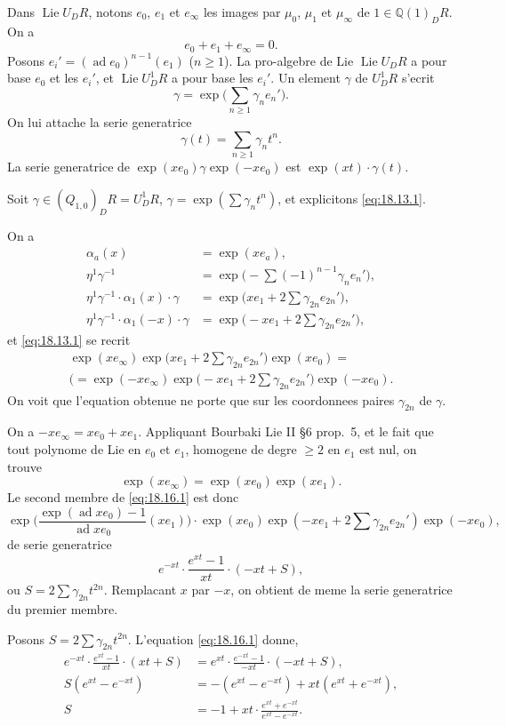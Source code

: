\documentclass[12pt,a4paper]{article}
\theoremstyle{plain}
\theoremstyle{definition}
\theoremstyle{remark}
\DeclareMathOperator{\Lie}{Lie}
\DeclareMathOperator{\ad}{ad}
\newcommand{\dR}{DR}
\newcommand{\QQ}{\mathbb{Q}}
\begin{document}
Dans $\Lie U_\dR$, notons $e_0$, $e_1$ et $e_\infty$ les images par
$\mu_0$, $\mu_1$ et $\mu_\infty$ de $1 \in \QQ(1)_\dR$. On a
\[
e_0 + e_1 + e_\infty = 0.
\]
Posons $e_i' = (\ad e_0)^{n-1}(e_1)$ ($n \geq 1$). La pro-algebre de
Lie $\Lie U_\dR$ a pour base $e_0$ et les $e_i'$, et
$\Lie U^1_\dR$ a pour base les $e_i'$. Un element $\gamma$ de
$U^1_\dR$ s'ecrit
\[
\gamma = \exp\bigl(\sum_{n \geq 1} \gamma_n e_n'\bigr).
\]
On lui attache la serie generatrice
\[
\gamma(t) = \sum_{n \geq 1} \gamma_n t^n.
\]
La serie generatrice de $\exp(xe_0) \gamma \exp(-xe_0)$ est
$\exp(xt) \cdot \gamma(t)$.

Soit $\gamma \in (Q_{1,0})_\dR = U^1_\dR$,
$\gamma = \exp(\sum \gamma_n t^n)$, et explicitons
\eqref{eq:18.13.1}.

On a
\begin{align*}
\alpha_a(x) &= \exp(xe_a), \\
\eta^1 \gamma^{-1} &= \exp\bigl(-\sum (-1)^{n-1} \gamma_n
e_n'\bigr), \\
\eta^1 \gamma^{-1} \cdot \alpha_1(x) \cdot \gamma &=
\exp\bigl(xe_1 + 2\sum \gamma_{2n} e_{2n}'\bigr), \\
\eta^1 \gamma^{-1} \cdot \alpha_1(-x) \cdot \gamma &=
\exp\bigl(-xe_1 + 2\sum \gamma_{2n} e_{2n}'\bigr),
\end{align*}
et \eqref{eq:18.13.1} se recrit
\begin{multline}\label{eq:18.16.1}
\exp(xe_\infty) \exp\bigl(xe_1 + 2\sum \gamma_{2n}
e_{2n}'\bigr) \exp(xe_0) = \\(= 
\exp(-xe_\infty) \exp\bigl(-xe_1 + 2\sum \gamma_{2n}
e_{2n}'\bigr) \exp(-xe_0).
\end{multline}
On voit que l'equation obtenue ne porte que sur les coordonnees
paires $\gamma_{2n}$ de $\gamma$.

On a $-xe_\infty = xe_0 + xe_1$. Appliquant Bourbaki Lie II \S 6
prop.\ 5, et le fait que tout polynome de Lie en $e_0$ et $e_1$,
homogene de degre $\geq 2$ en $e_1$ est nul, on trouve
\[
\exp(xe_\infty) = \exp(xe_0) \exp(xe_1).
\]
Le second membre de \eqref{eq:18.16.1} est donc
\[
\exp\bigl(\frac{\exp(\ad xe_0) - 1}{\ad xe_0}(xe_1)\bigr)
\cdot \exp(xe_0) \exp(-xe_1 + 2\sum \gamma_{2n} e_{2n}')
\exp(-xe_0),
\]
de serie generatrice
\[
e^{-xt} \cdot \frac{e^{xt} - 1}{xt} \cdot (-xt + S),
\]
ou $S = 2\sum \gamma_{2n} t^{2n}$. Remplacant $x$ par $-x$, on
obtient de meme la serie generatrice du premier membre.

Posons $S = 2\sum \gamma_{2n} t^{2n}$. L'equation
\eqref{eq:18.16.1} donne,
\begin{align*}
e^{-xt} \cdot \frac{e^{xt}-1}{xt} \cdot (xt + S) &= e^{xt}
\cdot \frac{e^{-xt}-1}{-xt} \cdot (-xt + S), \\
S(e^{xt} - e^{-xt}) &= -(e^{xt} - e^{-xt}) + xt(e^{xt} + e^{-xt}),
\\
S &= -1 + xt \cdot \frac{e^{xt} + e^{-xt}}{e^{xt} - e^{-xt}}.
\end{align*}
\end{document}
